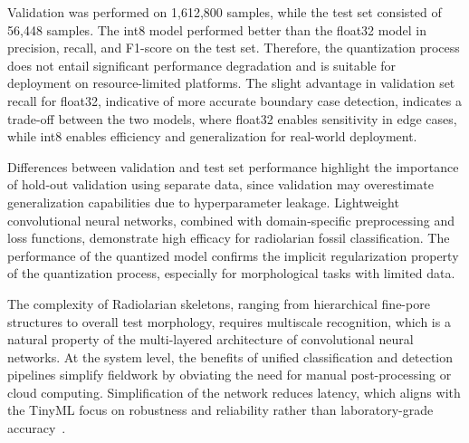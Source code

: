 \documentclass[a4paper,fleqn]{cas-sc}
\begin{document}
Validation was performed on 1,612,800 samples, while the test set consisted of 56,448 samples. The int8 model performed better than the float32 model in precision, recall, and F1-score on the test set. Therefore, the quantization process does not entail significant performance degradation and is suitable for deployment on resource-limited platforms. The slight advantage in validation set recall for float32, indicative of more accurate boundary case detection, indicates a trade-off between the two models, where float32 enables sensitivity in edge cases, while int8 enables efficiency and generalization for real-world deployment.

Differences between validation and test set performance highlight the importance of hold-out validation using separate data, since validation may overestimate generalization capabilities due to hyperparameter leakage. Lightweight convolutional neural networks, combined with domain-specific preprocessing and loss functions, demonstrate high efficacy for radiolarian fossil classification. The performance of the quantized model confirms the implicit regularization property of the quantization process, especially for morphological tasks with limited data.

The complexity of Radiolarian skeletons, ranging from hierarchical fine-pore structures to overall test morphology, requires multiscale recognition, which is a natural property of the multi-layered architecture of convolutional neural networks. At the system level, the benefits of unified classification and detection pipelines simplify fieldwork by obviating the need for manual post-processing or cloud computing. Simplification of the network reduces latency, which aligns with the TinyML focus on robustness and reliability rather than laboratory-grade accuracy~\cite{warden2019tinyml}.
\end{document}
